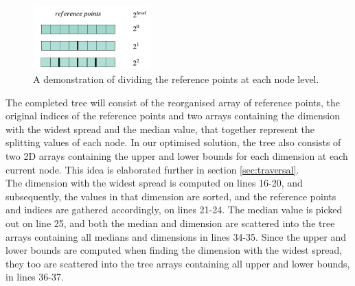 \begin{figure}[H]
\centering
\includegraphics[width=0.4\textwidth]{pics/plot-figs/divtree4.png}
\caption{A demonstration of dividing the reference points at each node level.}
\label{fig:divtree}
\end{figure}

The completed tree will consist of the reorganised array of reference points, the original indices of the reference points and two arrays containing the dimension with the widest spread and the median value, that together represent the splitting values of each node. In our optimised solution, the tree also consists of two 2D arrays containing the upper and lower bounds for each dimension at each current node. This idea is elaborated further in section \ref{sec:traversal}. 
\\[2mm]
The dimension with the widest spread is computed on lines 16-20, and subsequently, the values in that dimension are sorted, and the reference points and indices are gathered accordingly, on lines 21-24. The median value is picked out on line 25, and both the median and dimension are scattered into the tree arrays containing all medians and dimensions in lines 34-35. Since the upper and lower bounds are computed when finding the dimension with the widest spread, they too are scattered into the tree arrays containing all upper and lower bounds, in lines 36-37. 


